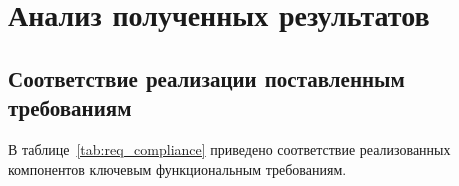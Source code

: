 
\section{Анализ полученных результатов}

\subsection{Соответствие реализации поставленным требованиям}

В таблице~\ref{tab:req_compliance} приведено соответствие
реализованных компонентов ключевым функциональным требованиям.

